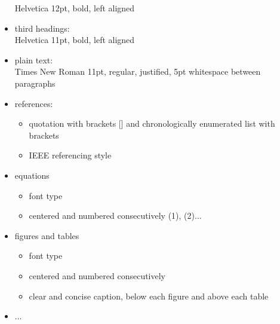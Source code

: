 \documentclass{ISMA_USD2020}
\begin{document}
\begin{itemize}
    Helvetica 12pt, bold, left aligned
  \item third headings:\\
    Helvetica 11pt, bold, left aligned
  \item plain text:\\
    Times New Roman 11pt, regular, justified, 5pt whitespace between paragraphs
  \item references:
   	\begin{itemize}
  		\item quotation with brackets [] and chronologically enumerated list with brackets
  		\item IEEE referencing style
	\end{itemize}
  \item equations
  	\begin{itemize}
  		\item font type
  		\item centered and numbered consecutively (1), (2)...
  	\end{itemize}
  \item figures and tables
	\begin{itemize}
		\item font type
		\item centered and numbered consecutively 
		\item clear and concise caption, below each figure and above each table
	\end{itemize}
  \item $\ldots$
\end{itemize}

\newpage
\end{document}

